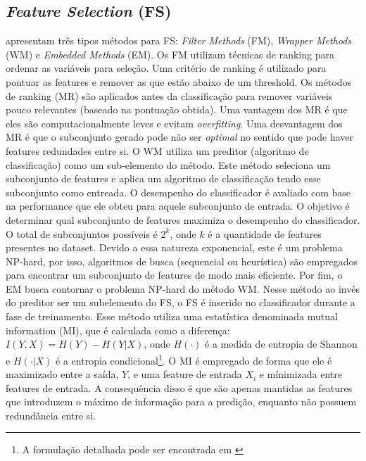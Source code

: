 \documentclass{article}
\begin{document}
\subsection{{\itshape Feature Selection} (FS)}
\citet{Chandrashekar2014} apresentam três tipos métodos para FS: \textit{Filter
  Methods} (FM), \textit{Wrapper Methods} (WM) e \textit{Embedded Methods} (EM).
Os FM utilizam técnicas de ranking para ordenar as variáveis para seleção.  Uma
critério de ranking é utilizado para pontuar as features e remover as que estão
abaixo de um threshold. Os métodos de ranking (MR) são aplicados antes da
classificação para remover variáveis pouco relevantes (baseado na pontuação
obtida). Uma vantagem dos MR é que eles são computacionalmente leves e evitam
\textit{overfitting}. Uma desvantagem dos MR é que o subconjunto gerado pode não
ser \textit{optimal} no sentido que pode haver features redundades entre si.  O
WM utiliza um preditor (algoritmo de classificação) como um sub-elemento do
método.  Este método seleciona um subconjunto de features e aplica um algoritmo
de classificação tendo esse subconjunto como entreada. O desempenho do
classificador é avaliado com base na performance que ele obteu para aquele
subconjunto de entrada. O objetivo é determinar qual subconjunto de features
maximiza o desempenho do classificador.  O total de subconjuntos possíveis é
$2^k$, onde $k$ é a quantidade de features presentes no dataset. Devido a essa
natureza exponencial, este é um problema NP-hard, por isso, algoritmos de busca
(sequencial ou heurística) são empregados para encontrar um subconjunto de
features de modo mais eficiente.  Por fim, o EM busca contornar o problema
NP-hard do método WM. Nesse método ao invés do preditor ser um subelemento do
FS, o FS é inserido no classificador durante a fase de treinamento. Esse método
utiliza uma estatística denominada mutual information (MI), que é calculada como
a diferença: $I(Y, X) = H(Y) - H(Y | X)$, onde $H(\cdot)$ é a medida de entropia
de Shannon e $H(\cdot| X)$ é a entropia condicional\footnote{A formulação
detalhada pode ser encontrada em \cite{Chandrashekar2014}}. O MI é empregado de
forma que ele é maximizado entre a saída, $Y$, e uma feature de entrada $X_i$ e
mínimizada entre features de entrada. A consequência disso é que são apenas
mantidas as features que introduzem o máximo de informação para a predição,
enquanto não possuem redundância entre si.

\end{document}
